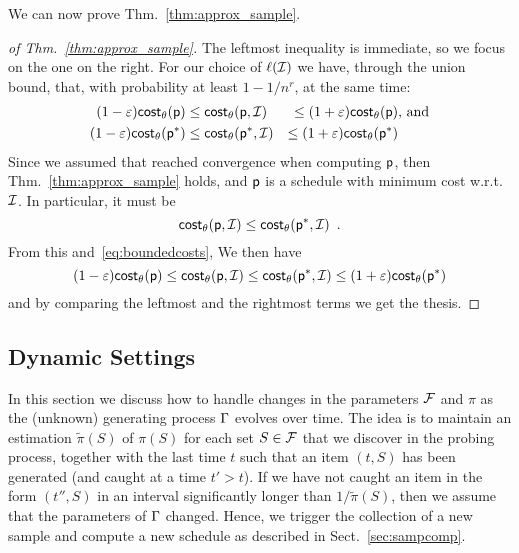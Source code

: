We can now prove Thm.~\ref{thm:approx_sample}.
\begin{proof}[of Thm.~\ref{thm:approx_sample}]
	The leftmost inequality is immediate, so we focus on the one on the right.
	For our choice of $\ell(\mathcal{I})$ we have, through the union bound, that,
	with probability at least $1-1/n^r$, at the same time:
	\begin{align}\label{eq:boundedcosts}
		(1-\varepsilon)\mathsf{cost}_\theta(\mathsf{p})&\leq \mathsf{cost}_\theta(\mathsf{p},\mathcal{I}) &\le
		(1+\varepsilon)\mathsf{cost}_\theta(\mathsf{p}) & \mbox{, and}\nonumber\\
		(1-\varepsilon)\mathsf{cost}_\theta(\mathsf{p}^*)&\leq \mathsf{cost}_\theta(\mathsf{p}^*,\mathcal{I}) &\le
		(1+\varepsilon)\mathsf{cost}_\theta(\mathsf{p}^*)&
	\end{align}
	Since we assumed that \algonameapx reached convergence when computing
	$\mathsf{p}$, then Thm.~\ref{thm:approx_sample} holds, and $\mathsf{p}$ is a
	schedule with minimum cost w.r.t.~$\mathcal{I}$. In particular, it must be
	\[
		\mathsf{cost}_\theta(\mathsf{p},\mathcal{I})\le \mathsf{cost}_\theta(\mathsf{p}^*,\mathcal{I})\enspace.
	\]
	From this and~\eqref{eq:boundedcosts}, We then have
	\[
		(1-\varepsilon)\mathsf{cost}_\theta(\mathsf{p})\leq \mathsf{cost}_\theta(\mathsf{p},\mathcal{I}) \le
		\mathsf{cost}_\theta(\mathsf{p}^*,\mathcal{I})\le (1+\varepsilon)\mathsf{cost}_\theta(\mathsf{p}^*)
	\]
	and by comparing the leftmost and the rightmost terms we get the thesis.
\end{proof}


\subsection{Dynamic Settings}\label{sec:dynamic}
In this section we discuss how to handle changes in the parameters $\mathcal{F}$ and
$\pi$ as the (unknown) generating process $\Gamma$  evolves over time.
The idea is to maintain an estimation $\tilde{\pi}(S)$ of $\pi(S)$ for each set $S\in \mathcal{F}$ that we discover in the probing process,
together with the last
time $t$ such that an item $(t,S)$ has been generated (and caught at a time
$t'>t$). If we have not caught an item in the form $(t'',S)$ in an interval
significantly longer than $1/\tilde{\pi}(S)$, then we assume that
the parameters of $\Gamma$ changed. Hence, we trigger the collection of a new
sample and compute a new schedule as described in Sect.~\ref{sec:sampcomp}.

